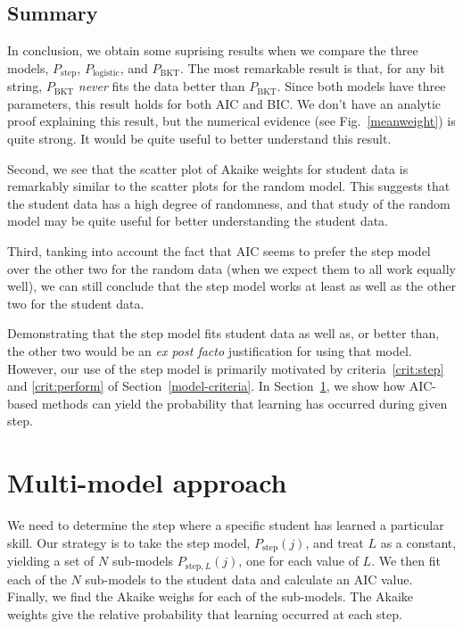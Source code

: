 \documentclass{acmlarge-edm}
\begin{document}
\subsection{Summary}

In conclusion, we obtain some suprising results when we compare
the three models,  $P_\mathrm{step}$, $P_\mathrm{logistic}$, and
$P_\mathrm{BKT}$.  The most remarkable result is that, for any bit
string,  $P_\mathrm{BKT}$ {\em never} fits the data better than $P_\mathrm{BKT}$.  Since 
both models have three parameters, this result holds for both
AIC and BIC.  We don't have an analytic proof explaining this result, 
but the numerical evidence (see Fig.~\ref{meanweight}) is quite strong.
It would be quite useful to better understand this result.

Second, we see that the scatter plot of Akaike weights for student
data is remarkably similar to the scatter plots for the random model.
This suggests that the student data has a high degree of randomness,
and that study of the random model may be quite useful for better
understanding the student data.

Third, tanking into account the fact that AIC seems to prefer the step model over the other
two for the random data (when we expect them to all work equally
well), we can still conclude that the step model works at least as
well as the other two for the student data.

Demonstrating that the step model fits student data as well as,
or better than, the other two would be an
{\em ex post facto} justification for using that model.  
However, our use of the step model is primarily motivated
by criteria~\ref{crit:step} and \ref{crit:perform} of 
Section~\ref{model-criteria}.
In Section~\ref{multi-model}, we show how AIC-based methods
can yield the probability that learning has occurred during given step.

\section{Multi-model approach}
\label{multi-model}

We need to determine the step where a specific student has learned a
particular skill.  Our strategy is to take the step model, 
$P_\mathrm{step}(j)$, and treat $L$ as a constant, yielding a set of $N$ 
sub-models $P_{\mathrm{step},L}(j)$, one for each value of $L$.
We then fit each of the $N$ sub-models to the student data and
calculate an AIC value.  Finally, we find the Akaike weighs for each of the
sub-models.  The Akaike weights give the relative probability that learning
occurred at each step.
\end{document}
